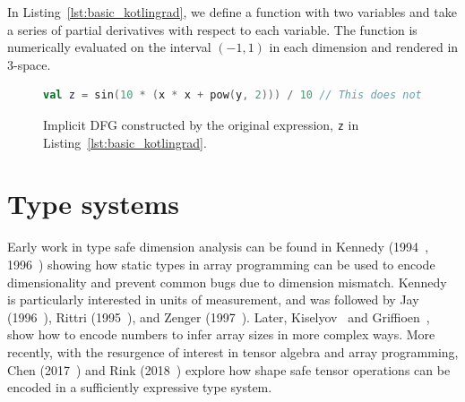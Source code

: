 \documentclass[12pt,initial,twoside,maitrise]{dms}
\numberwithin{equation}{section}
\numberwithin{table}{chapter}
\numberwithin{figure}{chapter}
\begin{document}
%
In Listing~\ref{lst:basic_kotlingrad}, we define a function with two variables and take a series of partial derivatives with respect to each variable. The function is numerically evaluated on the interval $(-1, 1)$ in each dimension and rendered in 3-space. %
%
\begin{figure}[!htb]
\begin{lstlisting}[language=Kotlin, basicstyle=\ttfamily\footnotesize]
val z = sin(10 * (x * x + pow(y, 2))) / 10 // This does not perform any calculation
\end{lstlisting}
\centering
{}
\caption{Implicit DFG constructed by the original expression, \texttt{z} in Listing~\ref{lst:basic_kotlingrad}.}
    \label{lst:edsl}
\end{figure}



\section{Type systems}\label{sec:type-systems}

Early work in type safe dimension analysis can be found in Kennedy (1994~\cite{kennedy1994dimension}, 1996~\cite{kennedy1996programming}) showing how static types in array programming can be used to encode dimensionality and prevent common bugs due to dimension mismatch. Kennedy is particularly interested in units of measurement, and was followed by Jay (1996~\cite{jay1996shape}), Rittri (1995~\cite{rittri1995dimension}), and Zenger (1997~\cite{zenger1997indexed}). Later, Kiselyov~\cite{kiselyov2005number,kiselyov2010fun} and Griffioen~\cite{griffioen2015type}, show how to encode numbers to infer array sizes in more complex ways. More recently, with the resurgence of interest in tensor algebra and array programming, Chen (2017~\cite{chen2017typesafe}) and Rink (2018~\cite{rink2018modeling}) explore how shape safe tensor operations can be encoded in a sufficiently expressive type system.
\end{document}
